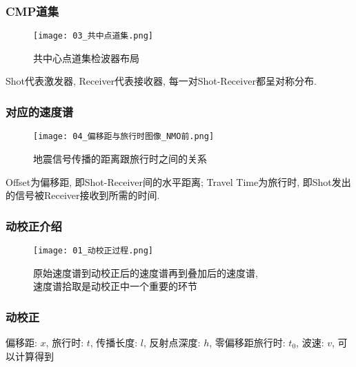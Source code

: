 \documentclass[10pt]{beamer}
\begin{document}
{\begin{frame}[c]
    \frametitle{CMP道集}
    \begin{minipage}{.55\paperwidth}
        \begin{figure}[h]
            \centering
            \texttt{[image: 03\_共中点道集.png]}
            \caption{共中心点道集检波器布局}
        \end{figure}
    \end{minipage}
    \begin{minipage}{.35\paperwidth}
        Shot代表激发器, Receiver代表接收器, 每一对Shot-Receiver都呈对称分布. 
    \end{minipage}
\end{frame}

\begin{frame}[c]
    \frametitle{对应的速度谱}
    \begin{minipage}{.55\paperwidth}
        \begin{figure}[h]
            \centering
            \texttt{[image: 04\_偏移距与旅行时图像\_NMO前.png]}
            \caption{地震信号传播的距离跟旅行时之间的关系}
        \end{figure}
    \end{minipage}
    \begin{minipage}{.35\paperwidth}
        Offset为偏移距, 即Shot-Receiver间的水平距离; Travel Time为旅行时, 即Shot发出的信号被Receiver接收到所需的时间. 
    \end{minipage}
\end{frame}

\begin{frame}[c]
    \frametitle{动校正介绍}
        \begin{figure}[h]
            \captionsetup{justification=centering}
            \texttt{[image: 01\_动校正过程.png]}
            \caption{原始速度谱到动校正后的速度谱再到叠加后的速度谱, \\速度谱拾取是动校正中一个重要的环节}
        \end{figure}
\end{frame}

\begin{frame}[c]
    \frametitle{动校正}
    偏移距: $x$, 旅行时: $t$, 传播长度: $l$, 反射点深度: $h$, 零偏移距旅行时: $t_0$, 波速: $v$, 可以计算得到


\end{frame}}
\end{document}
